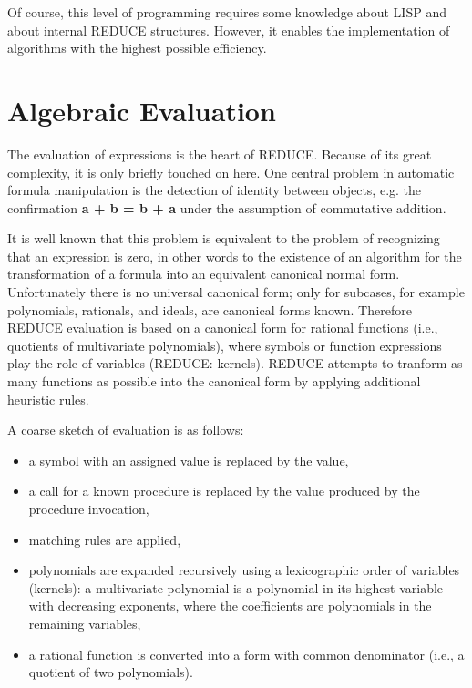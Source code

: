 Of course, this level of programming requires some knowledge about {\small
LISP} and about internal {\small REDUCE} structures.  However, it enables
the implementation of algorithms with the highest possible efficiency.

\section{Algebraic Evaluation}
 
The evaluation of expressions is the heart of {\small REDUCE}.  Because of
its great complexity, it is only briefly touched on here.  One central
problem in automatic formula manipulation is the detection of identity
between objects, e.g. the confirmation
     {\bf a + b  =   b + a }
under the assumption of commutative addition.

It is well known that this problem is equivalent to the problem of
recognizing that an expression is zero, in other words to the existence of
an algorithm for the transformation of a formula into an equivalent
canonical normal form.  Unfortunately there is no universal canonical
form; only for subcases, for example polynomials, rationals, and ideals,
are canonical forms known.  Therefore {\small REDUCE} evaluation is based
on a canonical form for rational functions (i.e., quotients of
multivariate polynomials), where symbols or function expressions play the
role of variables ({\small REDUCE}: kernels). {\small REDUCE} attempts to
tranform as many functions as possible into the canonical form by applying
additional heuristic rules.

A coarse sketch of evaluation is as follows:

\begin{itemize}
\item a symbol with an assigned value is
replaced by the value,
\item a call for a known procedure is
replaced by the value produced by the procedure invocation,
\item matching rules are applied,
\item polynomials are expanded recursively using a lexicographic
order of variables (kernels): a multivariate polynomial is a
polynomial in its highest variable with decreasing exponents,
where the coefficients are polynomials in the remaining
variables,
\item a rational function is converted into a form with common
denominator (i.e., a quotient of two polynomials).
\end{itemize}

